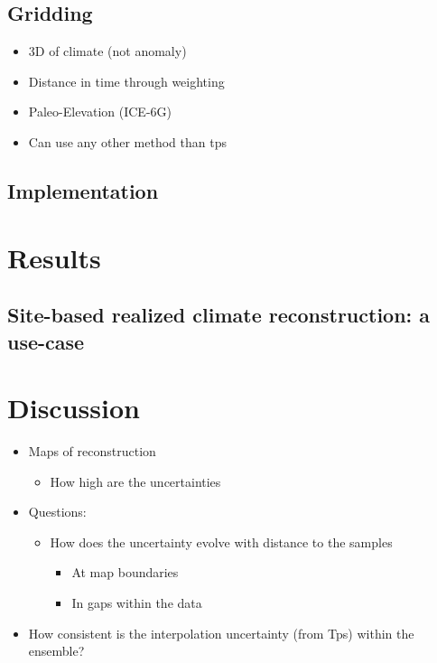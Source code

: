 \begin{refsection}
\subsection{Gridding}  \label{sec:gridding-gridding}
\begin{itemize}
	\item 3D of climate (not anomaly)
	\item Distance in time through weighting
	\item Paleo-Elevation (ICE-6G)
	\item Can use any other method than tps
\end{itemize}

\subsection{Implementation}  \label{sec:gridding-package}

\section{Results}  \label{sec:gridding-results}

\subsection{Site-based realized climate reconstruction: a use-case} \label{sec:gridding-site}

\section{Discussion}  \label{sec:gridding-discussion}

\begin{itemize}
	\item Maps of reconstruction
	\begin{itemize}
		\item How high are the uncertainties
	\end{itemize}
	\item Questions: 
	\begin{itemize}
		\item How does the uncertainty evolve with distance to the samples
		\begin{itemize}
			\item At map boundaries
			\item In gaps within the data
		\end{itemize}
	\end{itemize}
	\item How consistent is the interpolation uncertainty (from Tps) within the ensemble?
\end{itemize}



\end{refsection}
